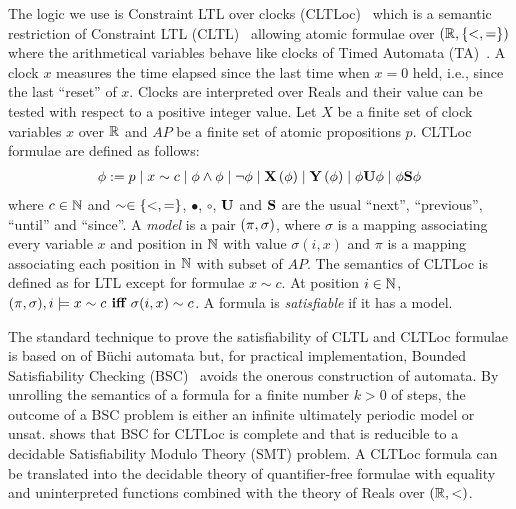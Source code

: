 The logic we use is Constraint LTL over clocks (CLTLoc)~\cite{BRS15} which is a semantic restriction of Constraint LTL (CLTL)~\cite{DD07} allowing atomic formulae over $(\mathbb{R}, \{ <,= \})$ where the arithmetical variables behave like clocks of Timed Automata (TA)~\cite{Alur&Dill94}.
A clock $x$ measures the time elapsed since the last time when $x=0$ held, i.e., since the last ``reset'' of $x$.
Clocks are interpreted over Reals and their value can be tested with respect to a positive integer value.
%
Let $X$ be a finite set of clock variables $x$ over $\mathbb{R}$ and $AP$ be a finite set of atomic propositions $p$.
CLTLoc formulae are defined as follows:
\begin{equation*}%
  \phi :=
  \begin{gathered}
    p \mid x\sim c \mid \phi \wedge \phi \mid \neg \phi \mid
   \X{\phi} \mid \Y{\phi} %
\mid \phi\U\phi \mid \phi\Snc\phi
  \end{gathered}
\end{equation*}
where %
$c \in \mathbb{N}$ and $\sim \in \{ <,= \}$, $\bullet$, $\circ$, $\mathbf{U}$ and $\mathbf{S}$ are the usual ``next'', ``previous'', ``until'' and ``since''.
A \textit{model} is a pair $(\pi, \sigma)$, where $\sigma$ is a mapping associating every variable $x$ and position in $\mathbb{N}$ with value $\sigma(i,x)$ and $\pi$ is a mapping associating each position in $\mathbb{N}$ with subset of $AP$. 
The semantics of CLTLoc is defined as for LTL except for formulae $x\sim c$. 
At position $i\in\mathbb{N}$, $ (\pi, \sigma), i \models x\sim c \textbf{ iff }  \sigma(i, x)\sim c$.
A formula is \textit{satisfiable} if it has a model.

The standard technique to prove the satisfiability of CLTL and CLTLoc formulae is based on of B\"uchi automata \cite{DD07,BRS15} %
but, for practical implementation, Bounded Satisfiability Checking (BSC)~\cite{MPS13} avoids the onerous construction of automata.
By unrolling the semantics of a formula for a finite number $k>0$ of steps, 
the outcome of a BSC problem is either an infinite ultimately periodic model or unsat.
\cite{BRS15} shows that BSC for CLTLoc is complete and that is reducible to a decidable Satisfiability Modulo Theory (SMT) problem. 
A CLTLoc formula can be translated into the decidable theory of quantifier-free formulae with equality and uninterpreted functions combined with the theory of Reals over $(\mathbb{R},<)$. %

